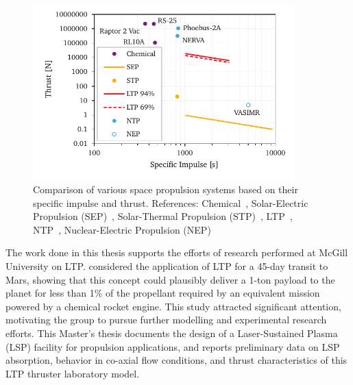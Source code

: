         \begin{figure}[h]
            \centering
            \includegraphics[width=0.9\textwidth]{assets/1 intro/propulsionComparison2}
            \caption[Comparison of various space propulsion systems]{Comparison of various space propulsion systems based on their specific impulse and thrust. References: Chemical~\cite{l3harrisRL10Engine2023,l3harrisRS25Engine2023,belluscioSpaceXAdvancesDrive2014}, Solar-Electric Propulsion (SEP)~\cite{aerojetrocketdyneNEXTCNASAEvolutionary2022}, Solar-Thermal Propulsion (STP)~\cite{woodcockEvaluationSolarThermal}, LTP~\cite{duplayDesignRapidTransit2022,shojiPerformanceHeatTransfer1976}, NTP~\cite{koenigExperienceGainedSpace1986}, Nuclear-Electric Propulsion (NEP)~\cite{adastraTechnology2013}}
            \label{fig:propulsion_comparison}
        \end{figure}

        The work done in this thesis supports the efforts of research performed at McGill University on LTP. \textcite{duplayDesignRapidTransit2022} considered the application of LTP for a 45-day transit to Mars, showing that this concept could plausibly deliver a 1-ton payload to the planet for less than 1\% of the propellant required by an equivalent mission powered by a chemical rocket engine. This study attracted significant attention, motivating the group to pursue further modelling and experimental research efforts. This Master's thesis documents the design of a Laser-Sustained Plasma (LSP) facility for propulsion applications, and reports preliminary data on LSP absorption, behavior in co-axial flow conditions, and thrust characteristics of this LTP thruster laboratory model.